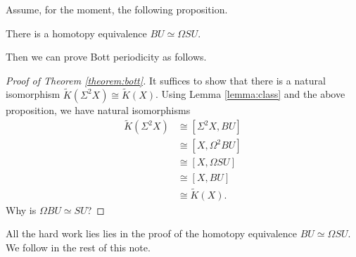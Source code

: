 \documentclass{amsart}
\begin{document}
Assume, for the moment, the following proposition.
\begin{proposition}
    There is a homotopy equivalence $BU\simeq\Omega SU$.
    \label{proposition:may}
\end{proposition}

Then we can prove Bott periodicity as follows.
\begin{proof}[Proof of Theorem \ref{theorem:bott}]
    It suffices to show that there is a natural isomorphism $\tilde K(\Sigma^2X)\cong\tilde K(X)$.
    Using Lemma \ref{lemma:class} and the above proposition, we have natural isomorphisms 
    \begin{align*}
        \tilde K(\Sigma^2X) &\cong [\Sigma^2X,BU]\\
        &\cong [X, \Omega^2BU]\\
        &\cong [X,\Omega SU]\\
        &\cong [X, BU]\\
        &\cong \tilde K(X).
    \end{align*}
    {\color{red} Why is $\Omega BU\simeq SU$?}
\end{proof}

All the hard work lies lies in the proof of the homotopy equivalence $BU\simeq\Omega SU$.
We follow \cite{mcat} in the rest of this note.

\printbibliography
\end{document}
